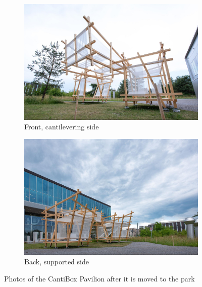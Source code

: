 \begin{figure}[!h]
    \centering
    \begin{subfigure}[b]{0.49\textwidth}
        \centering
        \includegraphics[width=\textwidth]{images/08/img32.jpg}
        \caption{Front, cantilevering side}
    \end{subfigure}
    \hfill
    \begin{subfigure}[b]{0.49\textwidth}
        \centering
        \includegraphics[width=\textwidth]{images/08/img33.jpg}
        \caption{Back, supported side}
    \end{subfigure}
    \caption{Photos of the CantiBox Pavilion after it is moved to the park}
    \label{fig:photo-cantibox-park-2}
\end{figure}

